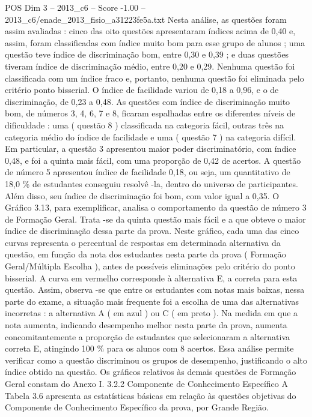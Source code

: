 \begin{textsample}{POS Dim 3 – 2013\_c6 – Score -1.00 – 2013\_c6/enade\_2013\_fisio\_a31223fe5a.txt}
Nesta análise, as questões foram assim avaliadas : cinco das oito questões apresentaram índices acima de 0,40 e, assim, foram classificadas com índice muito bom para esse grupo de alunos ; uma questão teve índice de discriminação bom, entre 0,30 e 0,39 ; e duas questões tiveram índice de discriminação médio, entre 0,20 e 0,29.
Nenhuma questão foi classificada com um índice fraco e, portanto, nenhuma questão foi eliminada pelo critério ponto bisserial.
O índice de facilidade variou de 0,18 a 0,96, e o de discriminação, de 0,23 a 0,48.
As questões com índice de discriminação muito bom, de números 3, 4, 6, 7 e 8, ficaram espalhadas entre os diferentes níveis de dificuldade : uma ( questão 8 ) classificada na categoria fácil, outras três na categoria médio do índice de facilidade e uma ( questão 7 ) na categoria difícil.
Em particular, a questão 3 apresentou maior poder discriminatório, com índice 0,48, e foi a quinta mais fácil, com uma proporção de 0,42 de acertos.
A questão de número 5 apresentou índice de facilidade 0,18, ou seja, um quantitativo de 18,0 \% de estudantes conseguiu resolvê -la, dentro do universo de participantes.
Além disso, seu índice de discriminação foi bom, com valor igual a 0,35.
O Gráfico 3.13, para exemplificar, analisa o comportamento da questão de número 3 de Formação Geral.
Trata -se da quinta questão mais fácil e a que obteve o maior índice de discriminação dessa parte da prova.
Neste gráfico, cada uma das cinco curvas representa o percentual de respostas em determinada alternativa da questão, em função da nota dos estudantes nesta parte da prova ( Formação Geral/Múltipla Escolha ), antes de possíveis eliminações pelo critério do ponto bisserial.
A curva em vermelho corresponde à alternativa E, a correta para esta questão.
Assim, observa -se que entre os estudantes com notas mais baixas, nessa parte do exame, a situação mais frequente foi a escolha de uma das alternativas incorretas : a alternativa A ( em azul ) ou C ( em preto ).
Na medida em que a nota aumenta, indicando desempenho melhor nesta parte da prova, aumenta concomitantemente a proporção de estudantes que selecionaram a alternativa correta E, atingindo 100 \% para os alunos com 8 acertos.
Essa análise permite verificar como a questão discriminou os grupos de desempenho, justificando o alto índice obtido na questão.
Os gráficos relativos às demais questões de Formação Geral constam do Anexo I. 3.2.2 Componente de Conhecimento Específico A Tabela 3.6 apresenta as estatísticas básicas em relação às questões objetivas do Componente de Conhecimento Específico da prova, por Grande Região.

\end{textsample}
